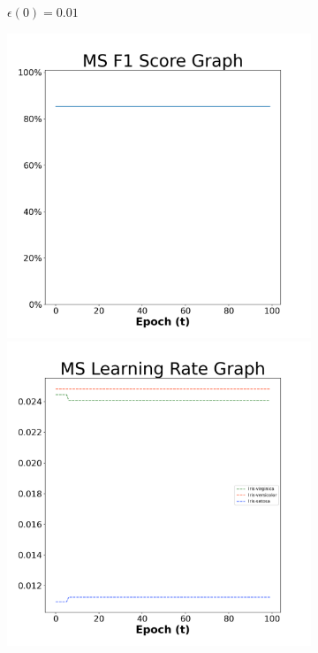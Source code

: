 \begin{figure}[H]
\begin{subfigure}{0.3\textwidth}
  \caption{$\epsilon(0)=0.01$}
\end{subfigure}\hfil %
\begin{subfigure}{0.3\textwidth}
  \includegraphics[width=\linewidth]{images/exper2/iris/MS_0.03_f1.png}
  \includegraphics[width=\linewidth]{images/exper2/iris/MS_0.03_lr.png}

\end{subfigure}
\end{figure}
